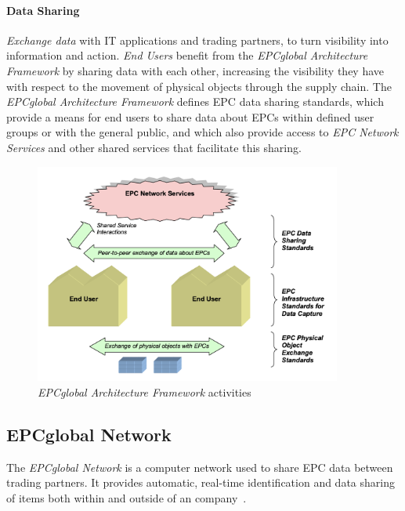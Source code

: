 \paragraph{Data Sharing} 

\emph{Exchange data} with \gls{IT} applications and trading partners, to turn visibility into information and action.
\emph{End Users} benefit from the \emph{EPCglobal Architecture Framework} by sharing data with each other, increasing the visibility they have with respect to the movement of physical objects through the \gls{supply chain}. 
The \emph{EPCglobal Architecture Framework} defines \gls{EPC} data sharing standards, which provide a means for end users to share data about \gls{EPC}s within defined user groups or with the general public, and which also provide access to \emph{EPC Network Services} and other shared services that facilitate this sharing. 

\begin{figure}[!ht]
    \centering
    \includegraphics[width=0.9\textwidth]{./assets/02-state-of-the-art/architecture-framework-activities.png}
    \caption{\emph{EPCglobal Architecture Framework} activities~\cite{Architecture6framework20140414Pdf}} 
    \label{fig:02:architecture-activities}
\end{figure}



\subsection{EPCglobal Network}

The \emph{EPCglobal Network} is a computer network used to share \gls{EPC} data between trading partners. 
It provides automatic, real-time identification and data sharing of items both within and outside of an company~\cite[p. 213]{lahiriRFIDSourcebook2005}.

